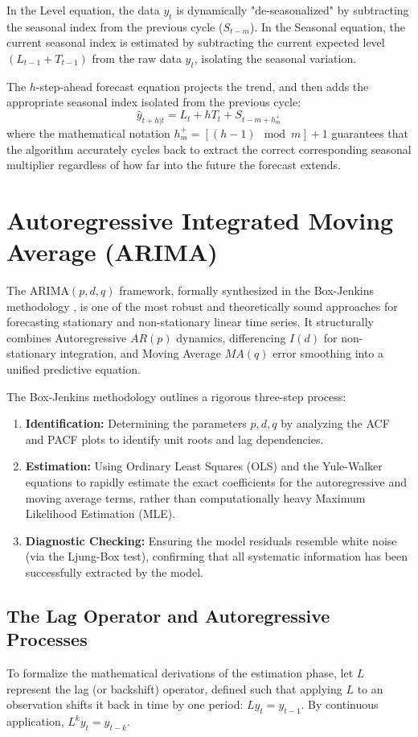 In the Level equation, the data $y_t$ is dynamically "de-seasonalized" by subtracting the seasonal index from the previous cycle ($S_{t-m}$). In the Seasonal equation, the current seasonal index is estimated by subtracting the current expected level $(L_{t-1} + T_{t-1})$ from the raw data $y_t$, isolating the seasonal variation.

The $h$-step-ahead forecast equation projects the trend, and then adds the appropriate seasonal index isolated from the previous cycle:
\begin{equation}
    \hat{y}_{t+h|t} = L_t + h T_t + S_{t-m+h_m^+}
\end{equation}
where the mathematical notation $h_m^+ = [(h-1) \mod m] + 1$ guarantees that the algorithm accurately cycles back to extract the correct corresponding seasonal multiplier regardless of how far into the future the forecast extends.


\section{Autoregressive Integrated Moving Average (ARIMA)}
The ARIMA$(p, d, q)$ framework, formally synthesized in the Box-Jenkins methodology \cite{BoxJenkins1970}, is one of the most robust and theoretically sound approaches for forecasting stationary and non-stationary linear time series. It structurally combines Autoregressive $AR(p)$ dynamics, differencing $I(d)$ for non-stationary integration, and Moving Average $MA(q)$ error smoothing into a unified predictive equation.

The Box-Jenkins methodology outlines a rigorous three-step process:
\begin{enumerate}
    \item \textbf{Identification:} Determining the parameters $p, d, q$ by analyzing the ACF and PACF plots to identify unit roots and lag dependencies.
    \item \textbf{Estimation:} Using Ordinary Least Squares (OLS) and the Yule-Walker equations to rapidly estimate the exact coefficients for the autoregressive and moving average terms, rather than computationally heavy Maximum Likelihood Estimation (MLE).
    \item \textbf{Diagnostic Checking:} Ensuring the model residuals resemble white noise (via the Ljung-Box test), confirming that all systematic information has been successfully extracted by the model.
\end{enumerate}

\subsection{The Lag Operator and Autoregressive Processes}
To formalize the mathematical derivations of the estimation phase, let $L$ represent the lag (or backshift) operator, defined such that applying $L$ to an observation shifts it back in time by one period: $L y_t = y_{t-1}$. By continuous application, $L^k y_t = y_{t-k}$.

